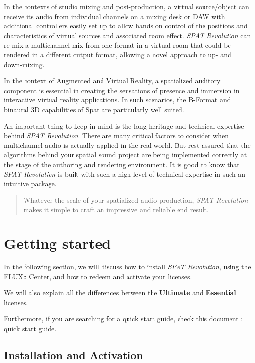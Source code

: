 \documentclass[
  letterpaper,
  DIV=11,
  numbers=noendperiod]{scrreport}
\begin{document}
In the contexts of studio mixing and post-production, a virtual
source/object can receive its audio from individual channels on a mixing
desk or DAW with additional controllers easily set up to allow hands on
control of the positions and characteristics of virtual sources and
associated room effect. \emph{SPAT Revolution} can re-mix a multichannel
mix from one format in a virtual room that could be rendered in a
different output format, allowing a novel approach to up- and
down-mixing.

In the context of Augmented and Virtual Reality, a spatialized auditory
component is essential in creating the sensations of presence and
immersion in interactive virtual reality applications. In such
scenarios, the B-Format and binaural 3D capabilities of Spat are
particularly well suited.

An important thing to keep in mind is the long heritage and technical
expertise behind \emph{SPAT Revolution}. There are many critical factors
to consider when multichannel audio is actually applied in the real
world. But rest assured that the algorithms behind your spatial sound
project are being implemented correctly at the stage of the authoring
and rendering environment. It is good to know that \emph{SPAT
Revolution} is built with such a high level of technical expertise in
such an intuitive package.

\begin{quote}
Whatever the scale of your spatialized audio production, \emph{SPAT
Revolution} makes it simple to craft an impressive and reliable end
result.
\end{quote}

\part{Getting started}

In the following section, we will discuss how to install \emph{SPAT
Revolution}, using the FLUX:: Center, and how to redeem and activate
your licenses.

We will also explain all the differences between the \textbf{Ultimate}
and \textbf{Essential} licenses.

Furthermore, if you are searching for a quick start guide, check this
document :
\href{https://public.3.basecamp.com/p/BoK99VxRwAJ2fFM9VGSzS3Am}{quick
start guide}.

\hypertarget{installation-and-activation}{%
\chapter{Installation and
Activation}\label{installation-and-activation}}
\end{document}
